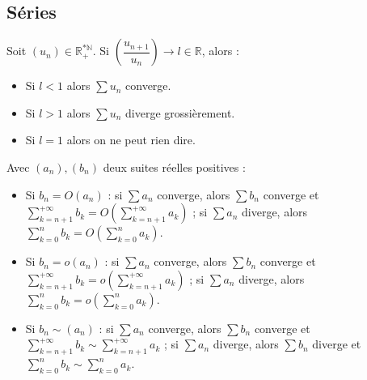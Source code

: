 \documentclass[a4paper,12pt]{book}
\newcommand{\Thr}[2]{\begin{tcolorbox}[sharp corners, colback=white,colframe=red!10!blue!30!green!75!, title=Théorème : #1]#2\end{tcolorbox}}
\def\R{\mathbb{R}}
\def\N{\mathbb{N}}
\begin{document}
\subsection{Séries}
\Thr{Critère de d'Alembert}{Soit $(u_n)\in\R_+^{*\N}$. Si $\left(\dfrac{u_{n+1}}{u_n}\right)\to l\in\R$, alors :\begin{itemize}
\item Si $l<1$ alors $\sum u_n$ converge.
\item Si $l>1$ alors $\sum u_n$ diverge grossièrement.
\item Si $l=1$ alors on ne peut rien dire.\end{itemize}
}	
\Thr{Sommation des ordres de grandeur}{Avec $(a_n),(b_n)$ deux suites réelles positives :\begin{itemize}
\item Si $b_n = O(a_n)$ : si $\sum a_n$ converge, alors $\sum b_n$ converge et $\sum\limits_{k=n+1}^{+\infty} b_k = O(\sum\limits_{k=n+1}^{+\infty} a_k)$ ; si $\sum a_n$ diverge, alors $\sum\limits_{k=0}^n b_k = O(\sum\limits_{k=0}^n a_k)$.
\item Si $b_n = o(a_n)$ : si $\sum a_n$ converge, alors $\sum b_n$ converge et $\sum\limits_{k=n+1}^{+\infty} b_k = o(\sum\limits_{k=n+1}^{+\infty} a_k)$ ; si $\sum a_n$ diverge, alors $\sum\limits_{k=0}^n b_k = o(\sum\limits_{k=0}^n a_k)$.
\item Si $b_n\sim(a_n)$ : si $\sum a_n$ converge, alors $\sum b_n$ converge et $\sum\limits_{k=n+1}^{+\infty} b_k \sim \sum\limits_{k=n+1}^{+\infty} a_k$ ; si $\sum a_n$ diverge, alors $\sum b_n$ diverge et $\sum\limits_{k=0}^n b_k \sim \sum\limits_{k=0}^n a_k$.
\end{itemize}}
\end{document}
